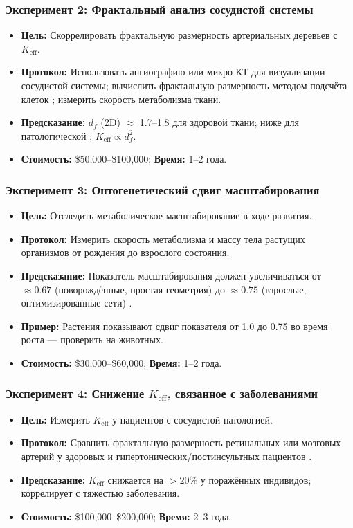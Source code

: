 \documentclass[12pt]{article}
\newcommand{\Keff}{K_{\mathrm{eff}}}
\begin{document}
	\subsubsection{Эксперимент 2: Фрактальный анализ сосудистой системы}
	\begin{itemize}
		\item \textbf{Цель:} Скоррелировать фрактальную размерность артериальных деревьев с \(\Keff\).
		\item \textbf{Протокол:} Использовать ангиографию или микро-КТ для визуализации сосудистой системы; вычислить фрактальную размерность методом подсчёта клеток \cite{Cross1993}; измерить скорость метаболизма ткани.
		\item \textbf{Предсказание:} \(d_f\) (2D) \(\approx\) 1.7–1.8 для здоровой ткани; ниже для патологической \cite{Gould1993}; \(\Keff \propto d_f^2\).
		\item \textbf{Стоимость:} \$50,000–\$100,000; \textbf{Время:} 1–2 года.
	\end{itemize}
	
	\subsubsection{Эксперимент 3: Онтогенетический сдвиг масштабирования}
	\begin{itemize}
		\item \textbf{Цель:} Отследить метаболическое масштабирование в ходе развития.
		\item \textbf{Протокол:} Измерить скорость метаболизма и массу тела растущих организмов от рождения до взрослого состояния.
		\item \textbf{Предсказание:} Показатель масштабирования должен увеличиваться от \(\approx 0.67\) (новорождённые, простая геометрия) до \(\approx 0.75\) (взрослые, оптимизированные сети) \cite{Glazier2005}.
		\item \textbf{Пример:} Растения показывают сдвиг показателя от 1.0 до 0.75 во время роста \cite{Reich2006} — проверить на животных.
		\item \textbf{Стоимость:} \$30,000–\$60,000; \textbf{Время:} 1–2 года.
	\end{itemize}
	
	\subsubsection{Эксперимент 4: Снижение \(\Keff\), связанное с заболеваниями}
	\begin{itemize}
		\item \textbf{Цель:} Измерить \(\Keff\) у пациентов с сосудистой патологией.
		\item \textbf{Протокол:} Сравнить фрактальную размерность ретинальных или мозговых артерий у здоровых и гипертонических/постинсультных пациентов \cite{Gould1993}.
		\item \textbf{Предсказание:} \(\Keff\) снижается на \(>20\%\) у поражённых индивидов; коррелирует с тяжестью заболевания.
		\item \textbf{Стоимость:} \$100,000–\$200,000; \textbf{Время:} 2–3 года.
	\end{itemize}
	
\end{document}
